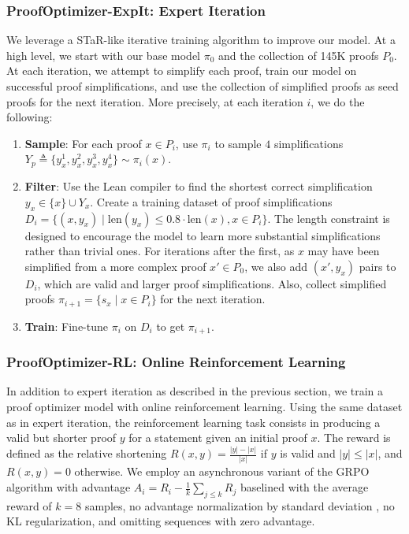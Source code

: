\subsubsection{ProofOptimizer-ExpIt: Expert Iteration} \label{subsec:iterative-training}
We leverage a STaR-like \citep{zelikman2022star} iterative training algorithm to improve our model. At a high level, we start with our base model $\pi_0$ and the collection of 145K proofs $P_0$. At each iteration, we attempt to simplify each proof, train our model on successful proof simplifications, and use the collection of simplified proofs as seed proofs for the next iteration. More precisely, at each iteration $i$, we do the following:
\begin{enumerate}[leftmargin=0.7cm]
\itemsep1pt
    \item \textbf{Sample}: For each proof $x \in P_i$, use $\pi_i$ to sample $4$ simplifications $Y_p \triangleq \{y_x^{1}, y_x^{2}, y_x^{3}, y_x^{4}\} \sim \pi_i(x)$.
    \item \textbf{Filter}: Use the Lean compiler to find the shortest correct simplification $y_x \in \{x\} \cup Y_x$. Create a training dataset of proof simplifications $D_i = \{(x, y_x) \mid \text{len}(y_x) \le 0.8 \cdot \text{len}(x), x \in P_i\}$. The length constraint is designed to encourage the model to learn more substantial simplifications rather than trivial ones. For iterations after the first, as $x$ may have been simplified from a more complex proof $x' \in P_0$, we also add $(x', y_x)$ pairs to $D_i$, which are valid and larger proof simplifications. Also, collect simplified proofs $\pi_{i+1} = \{s_x \mid x \in P_i\}$ for the next iteration. 
    \item \textbf{Train}: Fine-tune $\pi_i$ on $D_i$ to get $\pi_{i+1}$.
\end{enumerate}


\subsubsection{ProofOptimizer-RL: Online Reinforcement Learning} \label{sec:rl}
In addition to expert iteration as described in the previous section, we train a proof optimizer model with online reinforcement learning. Using the same dataset as in expert iteration, the reinforcement learning task consists in producing a valid but shorter proof $y$ for a statement given an initial proof $x$. The reward is defined as the relative shortening $R(x, y) = \frac{|y| - |x|}{|x|}$
if $y$ is valid and $|y| \leq |x|$, and $R(x, y) = 0$ otherwise. We employ an asynchronous variant of the GRPO algorithm \citep{shao2024grpo} with advantage $A_i = R_i - \frac{1}{k}\sum_{j \leq k} R_j$
baselined with the average reward of $k = 8$ samples, no advantage normalization by standard deviation \citep{liu2025understandingr1zeroliketrainingcritical}, no KL regularization, and omitting sequences with zero advantage.


